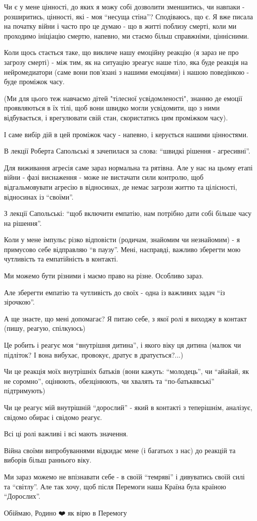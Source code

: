 Чи є у мене цінності, до яких я можу собі дозволити зменшитись, чи навпаки -
розширитись, цінності, які - моя \enquote{несуща стіна}? Сподіваюсь, що є. Я вже писала
на початку війни і часто про це думаю - що в житті поблизу смерті, коли ми
проходимо ініціацію смертю, напевно, ми стаємо більш справжніми, ціннісними. 

Коли щось стається таке, що викличе нашу емоційну реакцію (я зараз не про
загрозу смерті) - між тим, як на ситуацію  зреагує наше тіло, яка буде реакція
на нейромедиатори (саме вони пов'язані з нашими емоціями) і  нашою поведінкою -
буде проміжок часу.

(Ми для цього теж навчаємо дітей "тілесної усвідомленості", знанню де емоції
проявляються в їх тілі, щоб вони швидко могли усвідомити, що з ними
відбувається,  і врегулювати свій стан, скористатись цим проміжком часу).

І саме вибір дій в цей проміжок часу - напевно, і керується нашими цінностями. 

В лекції Роберта Сапольські я зачепилася за слова: \enquote{швидкі рішення  - агресивні}. 

Для виживання агресія саме зараз нормальна та рятівна. Але у нас на цьому етапі
війни - фазі виснаження - може не вистачати сили контролю, щоб відгальмовувати
агресію в відносинах, де немає загрози життю та цілісності, відносинах із
\enquote{своїми}. 

З лекції Сапольські: \enquote{щоб включити емпатію, нам потрібно дати собі
більше часу на рішення}. 

Коли у мене імпульс різко відповісти (родичам, знайомим чи незнайомим) - я
примусово себе відправляю \enquote{в паузу}. Мені, насправді, важливо зберегти
мою чутливість та емпатійність в контакті. 

Ми можемо бути різними і маємо право на різне.  Особливо зараз. 

Але зберегти емпатію та чутливість до своїх - одна із важливих задач
\enquote{із зірочкою}.

А ще знаєте, що мені допомагає? Я питаю себе, з якої ролі я виходжу в контакт
(пишу, реагую, спілкуюсь) 

Це робить і реагує моя \enquote{внутрішня дитина}, і якого віку ця дитина
(малюк чи підліток? І вона вибухає, провокує, дратує в дратується?...)

Чи це реакція моїх внутрішніх батьків  (вони кажуть: \enquote{молодець}, чи
\enquote{айайай, як не соромно}, оцінюють, обезцінюють, чи хвалять та
\enquote{по-батькввські} підтримують) 

Чи це реагує мій внутрішній \enquote{дорослий} - який в контакті з теперішнім,
аналізує, свідомо обирає і свідомо реагує. 

Всі ці ролі важливі і всі мають значення. 

Війна своїми випробуваннями відкидає мене (і багатьох з нас) до реакцій та виборів більш раннього віку. 

Ми зараз можемо не впізнавати себе - в своїй \enquote{темряві} і дивуватись своїй силі
та \enquote{світлу}. Але так хочу, щоб після Перемоги наша Країна була країною
\enquote{Дорослих}. 

Обіймаю, Родино ❤️ як вірю в Перемогу
